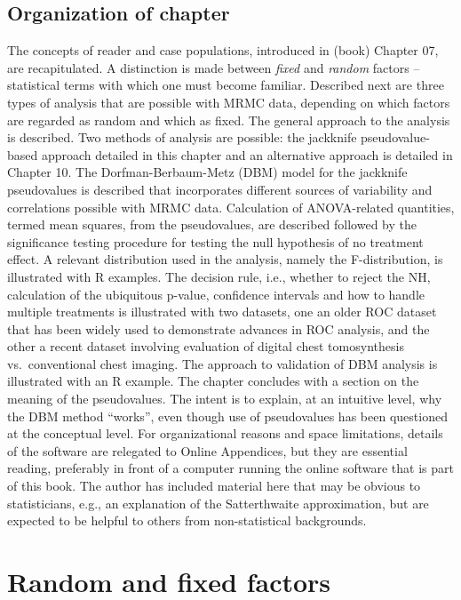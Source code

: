 \documentclass[
]{book}
\begin{document}
\hypertarget{organization-of-chapter}{%
\subsection{Organization of chapter}\label{organization-of-chapter}}

The concepts of reader and case populations, introduced in (book) Chapter 07, are recapitulated. A distinction is made between \emph{fixed} and \emph{random} factors -- statistical terms with which one must become familiar. Described next are three types of analysis that are possible with MRMC data, depending on which factors are regarded as random and which as fixed. The general approach to the analysis is described. Two methods of analysis are possible: the jackknife pseudovalue-based approach detailed in this chapter and an alternative approach is detailed in Chapter 10. The Dorfman-Berbaum-Metz (DBM) model for the jackknife pseudovalues is described that incorporates different sources of variability and correlations possible with MRMC data. Calculation of ANOVA-related quantities, termed mean squares, from the pseudovalues, are described followed by the significance testing procedure for testing the null hypothesis of no treatment effect. A relevant distribution used in the analysis, namely the F-distribution, is illustrated with R examples. The decision rule, i.e., whether to reject the NH, calculation of the ubiquitous p-value, confidence intervals and how to handle multiple treatments is illustrated with two datasets, one an older ROC dataset that has been widely used to demonstrate advances in ROC analysis, and the other a recent dataset involving evaluation of digital chest tomosynthesis vs.~conventional chest imaging. The approach to validation of DBM analysis is illustrated with an R example. The chapter concludes with a section on the meaning of the pseudovalues. The intent is to explain, at an intuitive level, why the DBM method ``works'', even though use of pseudovalues has been questioned at the conceptual level. For organizational reasons and space limitations, details of the software are relegated to Online Appendices, but they are essential reading, preferably in front of a computer running the online software that is part of this book. The author has included material here that may be obvious to statisticians, e.g., an explanation of the Satterthwaite approximation, but are expected to be helpful to others from non-statistical backgrounds.

\hypertarget{DBMAnalysisBkgrnd-random-fixed-factors}{%
\section{Random and fixed factors}\label{DBMAnalysisBkgrnd-random-fixed-factors}}
\end{document}
